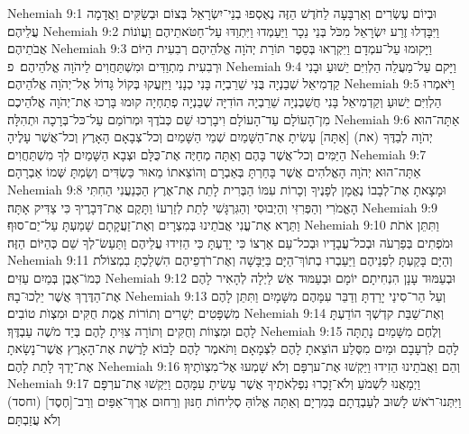 Nehemiah 9:1	וּבְיוֹם עֶשְׂרִים וְאַרְבָּעָה לַחֹדֶשׁ הַזֶּה נֶאֶסְפוּ בְנֵי־יִשְׂרָאֵל בְּצוֹם וּבְשַׂקִּים וַאֲדָמָה עֲלֵיהֶם׃
Nehemiah 9:2	וַיִּבָּדְלוּ זֶרַע יִשְׂרָאֵל מִכֹּל בְּנֵי נֵכָר וַיַּעַמְדוּ וַיִּתְוַדּוּ עַל־חַטֹּאתֵיהֶם וַעֲוֺנוֹת אֲבֹתֵיהֶם׃
Nehemiah 9:3	וַיָּקוּמוּ עַל־עמְדָם וַיִּקְרְאוּ בְּסֵפֶר תּוֹרַת יְהֹוָה אֱלֹהֵיהֶם רְבִעִית הַיּוֹם וּרְבִעִית מִתְוַדִּים וּמִשְׁתַּחֲוִים לַיהֹוָה אֱלֹהֵיהֶם׃ {פ}
Nehemiah 9:4	וַיָּקם עַל־מַעֲלֵה הַלְוִיִּם יֵשׁוּעַ וּבָנִי קַדְמִיאֵל שְׁבַנְיָה בֻּנִּי שֵׁרֵבְיָה בָּנִי כְנָנִי וַיִּזְעֲקוּ בְּקוֹל גָּדוֹל אֶל־יְהֹוָה אֱלֹהֵיהֶם׃
Nehemiah 9:5	וַיֹּאמְרוּ הַלְוִיִּם יֵשׁוּעַ וְקַדְמִיאֵל בָּנִי חֲשַׁבְנְיָה שֵׁרֵבְיָה הוֹדִיָּה שְׁבַנְיָה פְתַחְיָה קוּמוּ בָּרְכוּ אֶת־יְהֹוָה אֱלֹהֵיכֶם מִן־הָעוֹלָם עַד־הָעוֹלָם וִיבָרְכוּ שֵׁם כְּבֹדֶךָ וּמְרוֹמַם עַל־כּל־בְּרָכָה וּתְהִלָּה׃
Nehemiah 9:6	אַתָּה־הוּא יְהֹוָה לְבַדֶּךָ (את) [אַתָּה] עָשִׂיתָ אֶת־הַשָּׁמַיִם שְׁמֵי הַשָּׁמַיִם וְכל־צְבָאָם הָאָרֶץ וְכל־אֲשֶׁר עָלֶיהָ הַיַּמִּים וְכל־אֲשֶׁר בָּהֶם וְאַתָּה מְחַיֶּה אֶת־כֻּלָּם וּצְבָא הַשָּׁמַיִם לְךָ מִשְׁתַּחֲוִים׃
Nehemiah 9:7	אַתָּה־הוּא יְהֹוָה הָאֱלֹהִים אֲשֶׁר בָּחַרְתָּ בְּאַבְרָם וְהוֹצֵאתוֹ מֵאוּר כַּשְׂדִּים וְשַׂמְתָּ שְּׁמוֹ אַבְרָהָם׃
Nehemiah 9:8	וּמָצָאתָ אֶת־לְבָבוֹ נֶאֱמָן לְפָנֶיךָ וְכָרוֹת עִמּוֹ הַבְּרִית לָתֵת אֶת־אֶרֶץ הַכְּנַעֲנִי הַחִתִּי הָאֱמֹרִי וְהַפְּרִזִּי וְהַיְבוּסִי וְהַגִּרְגָּשִׁי לָתֵת לְזַרְעוֹ וַתָּקֶם אֶת־דְּבָרֶיךָ כִּי צַדִּיק אָתָּה׃
Nehemiah 9:9	וַתֵּרֶא אֶת־עֳנִי אֲבֹתֵינוּ בְּמִצְרָיִם וְאֶת־זַעֲקָתָם שָׁמַעְתָּ עַל־יַם־סוּף׃
Nehemiah 9:10	וַתִּתֵּן אֹתֹת וּמֹפְתִים בְּפַרְעֹה וּבְכל־עֲבָדָיו וּבְכל־עַם אַרְצוֹ כִּי יָדַעְתָּ כִּי הֵזִידוּ עֲלֵיהֶם וַתַּעַשׂ־לְךָ שֵׁם כְּהַיּוֹם הַזֶּה׃
Nehemiah 9:11	וְהַיָּם בָּקַעְתָּ לִפְנֵיהֶם וַיַּעַבְרוּ בְתוֹךְ־הַיָּם בַּיַּבָּשָׁה וְאֶת־רֹדְפֵיהֶם הִשְׁלַכְתָּ בִמְצוֹלֹת כְּמוֹ־אֶבֶן בְּמַיִם עַזִּים׃
Nehemiah 9:12	וּבְעַמּוּד עָנָן הִנְחִיתָם יוֹמָם וּבְעַמּוּד אֵשׁ לַיְלָה לְהָאִיר לָהֶם אֶת־הַדֶּרֶךְ אֲשֶׁר יֵלְכוּ־בָהּ׃
Nehemiah 9:13	וְעַל הַר־סִינַי יָרַדְתָּ וְדַבֵּר עִמָּהֶם מִשָּׁמָיִם וַתִּתֵּן לָהֶם מִשְׁפָּטִים יְשָׁרִים וְתוֹרוֹת אֱמֶת חֻקִּים וּמִצְוֺת טוֹבִים׃
Nehemiah 9:14	וְאֶת־שַׁבַּת קדְשְׁךָ הוֹדַעְתָּ לָהֶם וּמִצְווֹת וְחֻקִּים וְתוֹרָה צִוִּיתָ לָהֶם בְּיַד מֹשֶׁה עַבְדֶּךָ׃
Nehemiah 9:15	וְלֶחֶם מִשָּׁמַיִם נָתַתָּה לָהֶם לִרְעָבָם וּמַיִם מִסֶּלַע הוֹצֵאתָ לָהֶם לִצְמָאָם וַתֹּאמֶר לָהֶם לָבוֹא לָרֶשֶׁת אֶת־הָאָרֶץ אֲשֶׁר־נָשָׂאתָ אֶת־יָדְךָ לָתֵת לָהֶם׃
Nehemiah 9:16	וְהֵם וַאֲבֹתֵינוּ הֵזִידוּ וַיַּקְשׁוּ אֶת־ערְפָּם וְלֹא שָׁמְעוּ אֶל־מִצְוֺתֶיךָ׃
Nehemiah 9:17	וַיְמָאֲנוּ לִשְׁמֹעַ וְלֹא־זָכְרוּ נִפְלְאֹתֶיךָ אֲשֶׁר עָשִׂיתָ עִמָּהֶם וַיַּקְשׁוּ אֶת־ערְפָּם וַיִּתְּנוּ־רֹאשׁ לָשׁוּב לְעַבְדֻתָם בְּמִרְיָם וְאַתָּה אֱלוֹהַּ סְלִיחוֹת חַנּוּן וְרַחוּם אֶרֶךְ־אַפַּיִם וְרַב־[חֶסֶד] (וחסד) וְלֹא עֲזַבְתָּם׃
